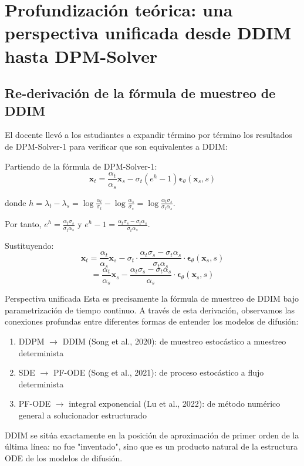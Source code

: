 \section{Profundización teórica: una perspectiva unificada desde DDIM hasta DPM-Solver}

\subsection{Re-derivación de la fórmula de muestreo de DDIM}

El docente llevó a los estudiantes a expandir término por término los resultados de DPM-Solver-1 para verificar que son equivalentes a DDIM:

Partiendo de la fórmula de DPM-Solver-1:
$$\mathbf{x}_t = \frac{\alpha_t}{\alpha_s} \mathbf{x}_s - \sigma_t (e^{h} - 1) \boldsymbol{\epsilon}_\theta(\mathbf{x}_s, s)$$

donde $h = \lambda_t - \lambda_s = \log\frac{\alpha_t}{\sigma_t} - \log\frac{\alpha_s}{\sigma_s} = \log\frac{\alpha_t \sigma_s}{\sigma_t \alpha_s}$.

Por tanto, $e^h = \frac{\alpha_t \sigma_s}{\sigma_t \alpha_s}$ y $e^h - 1 = \frac{\alpha_t \sigma_s - \sigma_t \alpha_s}{\sigma_t \alpha_s}$.

Sustituyendo:
$$\mathbf{x}_t = \frac{\alpha_t}{\alpha_s} \mathbf{x}_s - \sigma_t \cdot \frac{\alpha_t \sigma_s - \sigma_t \alpha_s}{\sigma_t \alpha_s} \cdot \boldsymbol{\epsilon}_\theta(\mathbf{x}_s, s)$$
$$= \frac{\alpha_t}{\alpha_s} \mathbf{x}_s - \frac{\alpha_t \sigma_s - \sigma_t \alpha_s}{\alpha_s} \cdot \boldsymbol{\epsilon}_\theta(\mathbf{x}_s, s)$$

\begin{importantbox}{Perspectiva unificada}
Esta es precisamente la fórmula de muestreo de DDIM bajo parametrización de tiempo continuo. A través de esta derivación, observamos las conexiones profundas entre diferentes formas de entender los modelos de difusión:
\begin{enumerate}
    \item DDPM $\to$ DDIM (Song et al., 2020): de muestreo estocástico a muestreo determinista
    \item SDE $\to$ PF-ODE (Song et al., 2021): de proceso estocástico a flujo determinista
    \item PF-ODE $\to$ integral exponencial (Lu et al., 2022): de método numérico general a solucionador estructurado
\end{enumerate}
DDIM se sitúa exactamente en la posición de aproximación de primer orden de la última línea: no fue "inventado", sino que es un producto natural de la estructura ODE de los modelos de difusión.
\end{importantbox}

